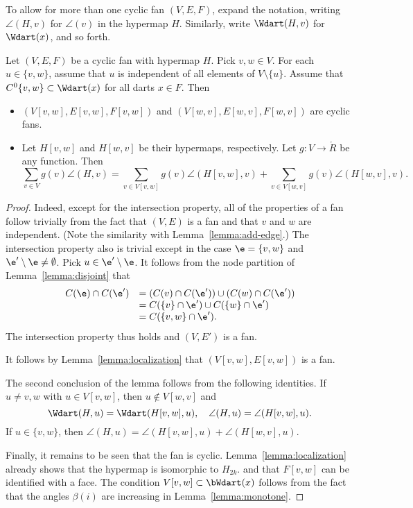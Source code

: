 To allow for more than one cyclic fan $(V,E,F)$,  expand the notation, writing $\angle(H,v)$ for $\angle(v)$ in the hypermap $H$.  Similarly, write $\Wdart(H,v)$ for $\Wdart(x)$, and so forth.
%
%


\begin{lemma}[slicing]\label{lemma:slice}  Let $(V,E,F)$ be a cyclic fan with hypermap $H$.  Pick $v,w\in V$. For each $u\in \{v,w\}$, assume that $u$ is independent of all elements of $V\setminus\{u\}$.    Assume that $C^0\{v,w\}\subset \Wdart(x)$ for all darts $x\in F$.  Then
\begin{itemize}
\item $(V[v,w],E[v,w],F[v,w])$ and $(V[w,v],E[w,v],F[w,v])$ are cyclic fans.  
\item Let $H[v,w]$ and $H[w,v]$ be their hypermaps, respectively.  Let $g:V\to\ring{R}$ be any function.  Then
$$
\sum_{v\in V} g(v)\angle(H,v) = \sum_{v\in V[v,w]}g(v)\angle(H[v,w],v) + \sum_{v\in V[w,v]}g(v)\angle(H[w,v],v).
$$
\end{itemize}
\end{lemma}
%
%

\begin{proof} 
 Indeed, except for the intersection property, all of the properties of a fan follow trivially from the fact that $(V,E)$ is a fan and
that $v$ and $w$ are independent.  (Note the similarity with Lemma~\ref{lemma:add-edge}.)
The intersection property also is trivial except in the case $\e=\{v,w\}$ and $\e'\setminus \e\ne \emptyset$.  Pick $u\in \e'\setminus\e$.  It follows from the node
partition of Lemma~\ref{lemma:disjoint} that
$$
\begin{array}{lll}
C(\e) \cap C(\e') &= (C(v) \cap C(\e')) \cup (C(w)\cap C(\e')) \\
 &= C(\{v\}\cap \e') \cup C(\{w\}\cap \e') \\
 &= C(\{v,w\}\cap \e').
\end{array}
$$
The intersection property thus holds and $(V,E')$ is a fan.

It follows by Lemma~\ref{lemma:localization} that $(V[v,w],E[v,w])$ is a fan.

The second conclusion of the lemma follows from the following identities.
If $u\ne v,w$ with $u\in V[v,w]$, then $u\not\in V[w,v]$ and 
\begin{equation}
\Wdart(H,u)=\Wdart(H[v,w],u),\quad \angle(H,u) = \angle(H[v,w],u).
\end{equation}
If $u\in\{v,w\}$, then 
$\angle(H,u)=\angle(H[v,w],u) +\angle(H[w,v],u)$.

Finally, it remains to be seen that the fan is cyclic.  Lemma~\ref{lemma:localization} already shows that the hypermap is isomorphic to $H_{2k}$. and that $F[v,w]$ can be identified with a face.  The condition $V[v,w]\subset \bWdart(x)$ follows from the fact that the angles $\beta(i)$ are increasing in Lemma~\ref{lemma:monotone}.
\end{proof}

